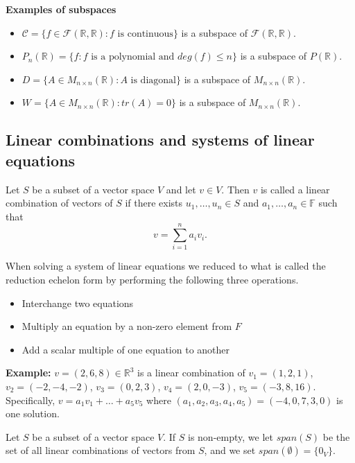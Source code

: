 \documentclass[12pt]{article}
\newenvironment{definition}[2][Definition]{\begin{trivlist}
\item[\hskip \labelsep {\bfseries #1}\hskip \labelsep {\bfseries #2}]}{\end{trivlist}}
\begin{document}
\textbf{Examples of subspaces}

\begin{itemize}
    \item[(1)] $\mathcal{C} = \{f \in \mathcal{F}(\mathbb{R}, \mathbb{R}) : f \text{ is continuous}\}$ is a subspace of $\mathcal{F}(\mathbb{R}, \mathbb{R})$.
    \item[(2)] $P_n(\mathbb{R}) = \{f : f \text{ is a polynomial and } deg(f) \leq n\}$ is a subspace of $P(\mathbb{R})$.
    \item[(3)] $D = \{A \in M_{n \times n}(\mathbb{R}) : A \text{ is diagonal}\}$ is a subspace of $M_{n \times n}(\mathbb{R})$.
    \item[(4)] $W = \{A \in  M_{n \times n}(\mathbb{R}) : tr(A) = 0\}$ is a subspace of $ M_{n \times n}(\mathbb{R})$.
\end{itemize}

\subsection{Linear combinations and systems of linear equations}

\begin{definition}{4}
Let $S$ be a subset of a vector space $V$ and let $v \in V$. Then $v$ is called a linear combination of vectors of $S$ if there exists $u_1, \dots, u_n \in S$ and $a_1, \dots, a_n \in \mathbb{F}$ such that $$v = \sum_{i = 1}^na_iv_i.$$
\end{definition}

\noindent When solving a system of linear equations we reduced to what is called the reduction echelon form by performing the following three operations.

\begin{itemize}
    \item Interchange two equations
    \item Multiply an equation by a non-zero element from $F$
    \item Add a scalar multiple of one equation to another
\end{itemize}

\noindent\textbf{Example:} $v = (2, 6, 8) \in \mathbb{R}^3$ is a linear combination of $v_1 = (1, 2, 1)$, $v_2 = (-2, -4, -2)$, $v_3 = (0, 2, 3)$, $v_4 = (2, 0, -3)$, $v_5 = (-3, 8, 16)$. Specifically, $v = a_1v_1 + \dots + a_5v_5$ where $(a_1, a_2, a_3, a_4, a_5) = (-4, 0, 7, 3, 0)$ is one solution. 

\begin{definition}{5}
Let $S$ be a subset of a vector space $V$. If $S$ is non-empty, we let $span(S)$ be the set of all linear combinations of vectors from $S$, and we set $span(\emptyset) = \{0_V\}$.
\end{definition}
\end{document}
